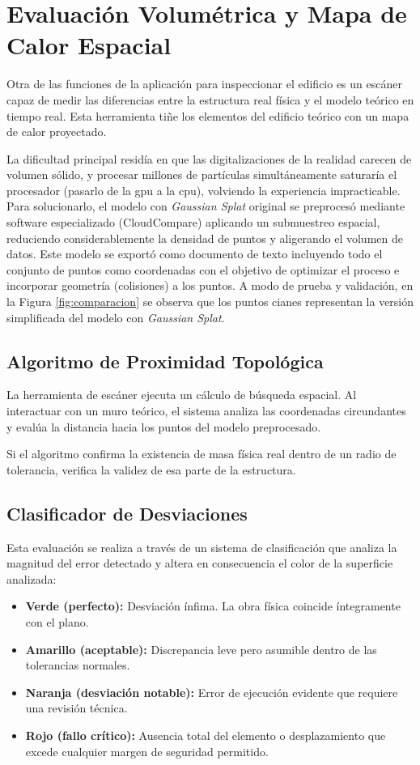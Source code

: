 \section{Evaluación Volumétrica y Mapa de Calor Espacial}

Otra de las funciones de la aplicación para inspeccionar el edificio es un escáner capaz de medir las diferencias entre la estructura real física y el modelo teórico en tiempo real. Esta herramienta tiñe los elementos del edificio teórico con un mapa de calor proyectado.

La dificultad principal residía en que las digitalizaciones de la realidad carecen de volumen sólido, y procesar millones de partículas simultáneamente saturaría el procesador (pasarlo de la \gls{gpu} a la \gls{cpu}), volviendo la experiencia impracticable. Para solucionarlo, el modelo con \textit{Gaussian Splat} original se preprocesó mediante software especializado (CloudCompare) aplicando un submuestreo espacial, reduciendo considerablemente la densidad de puntos y aligerando el volumen de datos. Este modelo se exportó como documento de texto incluyendo todo el conjunto de puntos como coordenadas con el objetivo de optimizar el proceso e incorporar geometría (colisiones) a los puntos. A modo de prueba y validación, en la Figura \ref{fig:comparacion} se observa que los puntos cianes representan la versión simplificada del modelo con \textit{Gaussian Splat}.

\subsection{Algoritmo de Proximidad Topológica}
La herramienta de escáner ejecuta un cálculo de búsqueda espacial. Al interactuar con un muro teórico, el sistema analiza las coordenadas circundantes y evalúa la distancia hacia los puntos del modelo preprocesado.

Si el algoritmo confirma la existencia de masa física real dentro de un radio de tolerancia, verifica la validez de esa parte de la estructura.

\subsection{Clasificador de Desviaciones}
Esta evaluación se realiza a través de un sistema de clasificación que analiza la magnitud del error detectado y altera en consecuencia el color de la superficie analizada:
\begin{itemize}
    \item \textbf{Verde (perfecto):} Desviación ínfima. La obra física coincide íntegramente con el plano.
    \item \textbf{Amarillo (aceptable):} Discrepancia leve pero asumible dentro de las tolerancias normales.
    \item \textbf{Naranja (desviación notable):} Error de ejecución evidente que requiere una revisión técnica.
    \item \textbf{Rojo (fallo crítico):} Ausencia total del elemento o desplazamiento que excede cualquier margen de seguridad permitido.
\end{itemize}

